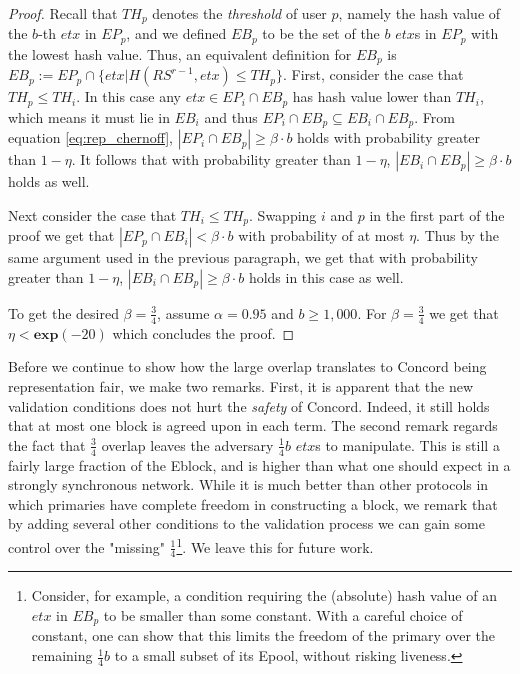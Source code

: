 \begin{proof}
Recall that $TH_p$ denotes the \textit{threshold} of user $p$, namely the hash value of the $b$-th $etx$ in $EP_p$, and we defined $EB_p$ to be the set of the $b$ $etx$s in $EP_p$ with the lowest hash value. Thus, an equivalent definition for $EB_p$ is $EB_p:=EP_p\cap \{etx|H(RS^{r-1},etx)\leq TH_p\}$. First, consider the case that $TH_p\leq TH_i$. In this case any $etx\in EP_i\cap EB_p$ has hash value lower than $TH_i$, which means it must lie in $EB_i$ and thus $EP_i\cap EB_p\subseteq EB_i \cap EB_p$. From equation \ref{eq:rep_chernoff}, $|EP_i\cap EB_p|\geq \beta\cdot b$ holds with probability greater than $1-\eta$.  It follows that with probability greater than $1-\eta$,  $|EB_i\cap EB_p|\geq \beta \cdot b$ holds as well. 

Next consider the case that $TH_i\leq TH_p$. Swapping $i$ and $p$ in the first part of the proof we get that $|EP_p\cap EB_i|< \beta \cdot b$ with probability of at most $\eta$. Thus by the same argument used in the previous paragraph, we get that with probability greater than $1-\eta$, $|EB_i\cap EB_p|\geq \beta \cdot b$ holds in this case as well.

To get the desired $\beta=\frac{3}{4}$, assume $\alpha=0.95$ and $b\geq 1,000$. For $\beta=\frac{3}{4}$ we get that $\eta<\textbf{exp}(-20)$ which concludes the proof. 
    \end{proof}
    
Before we continue to show how the large overlap translates to Concord being representation fair, we make two remarks. First, it is apparent that the new validation conditions does not hurt the \emph{safety} of Concord. Indeed, it still holds that at most one block is agreed upon in each term. The second remark regards the fact that $\frac{3}{4}$ overlap leaves the adversary $\frac{1}{4}b$ $etx$s to manipulate. This is still a fairly large fraction of the Eblock, and is higher than what one should expect in a strongly synchronous network. While it is much better than other protocols in which primaries have complete freedom in constructing a block, we remark that by adding several other conditions to the validation process we can gain some control over the "missing" $\frac{1}{4}$\footnote{Consider, for example, a condition requiring the (absolute) hash value of an $etx$ in $EB_p$ to be smaller than some constant. With a careful choice of constant, one can show that this limits the freedom of the primary over the remaining $\frac{1}{4}b$ to a small subset of its Epool, without risking liveness.}. We leave this for future work.
